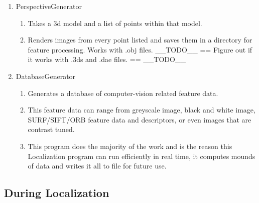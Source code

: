 \documentclass[a4paper,11pt]{article}
\begin{document}
    \begin{enumerate}
    \item PerspectiveGenerator
        \begin{enumerate}
        \item Takes a 3d model and a list of points within that model.
        \item Renders images from every point listed and saves them in a directory for feature processing. Works with .obj files. __TODO__ == Figure out if it works with .3ds and .dae files. == __TODO__
        \end{enumerate}
    \item DatabaseGenerator
        \begin{enumerate}
        \item Generates a database of computer-vision related feature data.
        \item This feature data can range from greyscale image, black and white image, SURF/SIFT/ORB feature data and descriptors, or even images that are contrast tuned.
        \item This program does the majority of the work and is the reason this Localization program can run efficiently in real time, it computes mounds of data and writes it all to file for future use.
        \end{enumerate}
    \end{enumerate}
  
    \subsection{During Localization}
  
  
\end{document}
